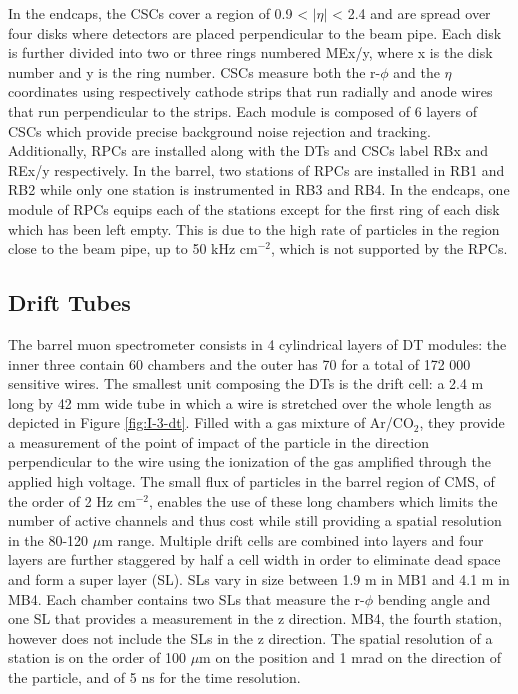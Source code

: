     In the endcaps, the CSCs cover a region of 0.9 < $ | \eta | $ < 2.4 and are spread over four disks where detectors are placed perpendicular to the beam pipe. Each disk is further divided into two or three rings numbered MEx/y, where x is the disk number and y is the ring number. CSCs measure both the r-$\phi$ and the $ \eta $ coordinates using respectively cathode strips that run radially and anode wires that run perpendicular to the strips. Each module is composed of 6 layers of CSCs which provide precise background noise rejection and tracking. \\

    Additionally, RPCs are installed along with the DTs and CSCs label RBx and REx/y respectively. In the barrel, two stations of RPCs are installed in RB1 and RB2 while only one station is instrumented in RB3 and RB4. In the endcaps, one module of RPCs equips each of the stations except for the first ring of each disk which has been left empty. This is due to the high rate of particles in the region close to the beam pipe, up to 50 kHz cm$^{-2}$, which is not supported by the RPCs.

    \subsection{Drift Tubes}

      The barrel muon spectrometer consists in 4 cylindrical layers of DT modules: the inner three contain 60 chambers and the outer has 70 for a total of 172 000 sensitive wires. The smallest unit composing the DTs is the drift cell: a 2.4 m long by 42 mm wide tube in which a wire is stretched over the whole length as depicted in Figure \ref{fig:I-3-dt}. Filled with a gas mixture of Ar/CO$_2$, they provide a measurement of the point of impact of the particle in the direction perpendicular to the wire using the ionization of the gas amplified through the applied high voltage. The small flux of particles in the barrel region of CMS, of the order of 2 Hz cm$^{-2}$, enables the use of these long chambers which limits the number of active channels and thus cost while still providing a spatial resolution in the 80-120 $\mu$m range. Multiple drift cells are combined into layers and four layers are further staggered by half a cell width in order to eliminate dead space and form a super layer (SL). SLs vary in size between 1.9 m in MB1 and 4.1 m in MB4. Each chamber contains two SLs that measure the r-$\phi$ bending angle and one SL that provides a measurement in the z direction. MB4, the fourth station, however does not include the SLs in the z direction. The spatial resolution of a station is on the order of 100 $\mu$m on the position and 1 mrad on the direction of the particle, and of 5 ns for the time resolution. \\

